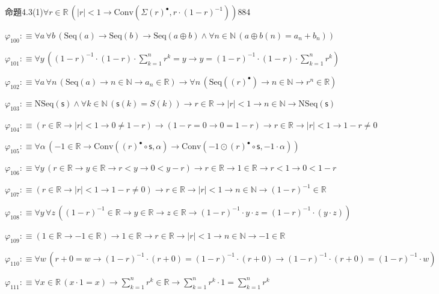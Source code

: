 \begin{fullproof}{命題4.3(1)}{$\forall r \in \mathbb{R}\,(\lvert r \rvert < 1 \to \mathrm{Conv}(\Sigma {(r)^{\bullet}},r \cdot (1 - r)^{-1}))$}{884}
\begin{abbrevlist}
\item $\varphi_{100} :\equiv \forall a\,\forall b\,(\mathrm{Seq}(a) \to \mathrm{Seq}(b) \to \mathrm{Seq}(a \oplus b) \land \forall n \in \mathbb{N}\,(a \oplus b(n) = a_{n} + b_{n}))$
\item $\varphi_{101} :\equiv \forall y\,((1 - r)^{-1} \cdot (1 - r) \cdot {\textstyle\sum_{k=1}^{n} {{r}^{k}}} = y \to y = (1 - r)^{-1} \cdot (1 - r) \cdot {\textstyle\sum_{k=1}^{n} {{r}^{k}}})$
\item $\varphi_{102} :\equiv \forall a\,\forall n\,(\mathrm{Seq}(a) \to n \in \mathbb{N} \to a_{n} \in \mathbb{R}) \to \forall n\,(\mathrm{Seq}({(r)^{\bullet}}) \to n \in \mathbb{N} \to {{r}^{n}} \in \mathbb{R})$
\item $\varphi_{103} :\equiv \mathrm{NSeq}(\mathsf{s}) \land \forall k \in \mathbb{N}\,(\mathsf{s}(k) = S(k)) \to r \in \mathbb{R} \to \lvert r \rvert < 1 \to n \in \mathbb{N} \to \mathrm{NSeq}(\mathsf{s})$
\item $\varphi_{104} :\equiv (r \in \mathbb{R} \to \lvert r \rvert < 1 \to 0 \neq 1 - r) \to (1 - r = 0 \to 0 = 1 - r) \to r \in \mathbb{R} \to \lvert r \rvert < 1 \to 1 - r \neq 0$
\item $\varphi_{105} :\equiv \forall \alpha\,(-1 \in \mathbb{R} \to \mathrm{Conv}({(r)^{\bullet}} \circ \mathsf{s},\alpha) \to \mathrm{Conv}(-1 \odot {(r)^{\bullet}} \circ \mathsf{s},-1 \cdot \alpha))$
\item $\varphi_{106} :\equiv \forall y\,(r \in \mathbb{R} \to y \in \mathbb{R} \to r < y \to 0 < y - r) \to r \in \mathbb{R} \to 1 \in \mathbb{R} \to r < 1 \to 0 < 1 - r$
\item $\varphi_{107} :\equiv (r \in \mathbb{R} \to \lvert r \rvert < 1 \to 1 - r \neq 0) \to r \in \mathbb{R} \to \lvert r \rvert < 1 \to n \in \mathbb{N} \to (1 - r)^{-1} \in \mathbb{R}$
\item $\varphi_{108} :\equiv \forall y\,\forall z\,((1 - r)^{-1} \in \mathbb{R} \to y \in \mathbb{R} \to z \in \mathbb{R} \to (1 - r)^{-1} \cdot y \cdot z = (1 - r)^{-1} \cdot (y \cdot z))$
\item $\varphi_{109} :\equiv (1 \in \mathbb{R} \to -1 \in \mathbb{R}) \to 1 \in \mathbb{R} \to r \in \mathbb{R} \to \lvert r \rvert < 1 \to n \in \mathbb{N} \to -1 \in \mathbb{R}$
\item $\varphi_{110} :\equiv \forall w\,(r + 0 = w \to (1 - r)^{-1} \cdot (r + 0) = (1 - r)^{-1} \cdot (r + 0) \to (1 - r)^{-1} \cdot (r + 0) = (1 - r)^{-1} \cdot w)$
\item $\varphi_{111} :\equiv \forall x \in \mathbb{R}\,(x \cdot 1 = x) \to {\textstyle\sum_{k=1}^{n} {{r}^{k}}} \in \mathbb{R} \to {\textstyle\sum_{k=1}^{n} {{r}^{k}}} \cdot 1 = {\textstyle\sum_{k=1}^{n} {{r}^{k}}}$

\end{abbrevlist}
\end{fullproof}
